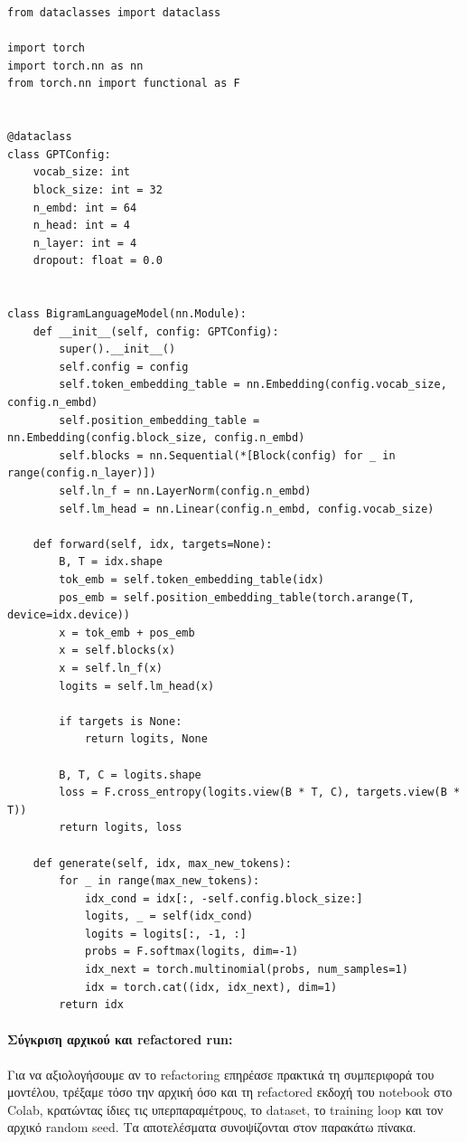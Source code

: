 \documentclass[11pt,a4paper]{article}
\begin{document}
\begin{lstlisting}[caption={Refactored configuration and model skeleton}]
from dataclasses import dataclass

import torch
import torch.nn as nn
from torch.nn import functional as F


@dataclass
class GPTConfig:
    vocab_size: int
    block_size: int = 32
    n_embd: int = 64
    n_head: int = 4
    n_layer: int = 4
    dropout: float = 0.0


class BigramLanguageModel(nn.Module):
    def __init__(self, config: GPTConfig):
        super().__init__()
        self.config = config
        self.token_embedding_table = nn.Embedding(config.vocab_size, config.n_embd)
        self.position_embedding_table = nn.Embedding(config.block_size, config.n_embd)
        self.blocks = nn.Sequential(*[Block(config) for _ in range(config.n_layer)])
        self.ln_f = nn.LayerNorm(config.n_embd)
        self.lm_head = nn.Linear(config.n_embd, config.vocab_size)

    def forward(self, idx, targets=None):
        B, T = idx.shape
        tok_emb = self.token_embedding_table(idx)
        pos_emb = self.position_embedding_table(torch.arange(T, device=idx.device))
        x = tok_emb + pos_emb
        x = self.blocks(x)
        x = self.ln_f(x)
        logits = self.lm_head(x)

        if targets is None:
            return logits, None

        B, T, C = logits.shape
        loss = F.cross_entropy(logits.view(B * T, C), targets.view(B * T))
        return logits, loss

    def generate(self, idx, max_new_tokens):
        for _ in range(max_new_tokens):
            idx_cond = idx[:, -self.config.block_size:]
            logits, _ = self(idx_cond)
            logits = logits[:, -1, :]
            probs = F.softmax(logits, dim=-1)
            idx_next = torch.multinomial(probs, num_samples=1)
            idx = torch.cat((idx, idx_next), dim=1)
        return idx
\end{lstlisting}

\paragraph{Σύγκριση αρχικού και \textlatin{refactored run}:}

Για να αξιολογήσουμε αν το \textlatin{refactoring} επηρέασε πρακτικά τη συμπεριφορά του μοντέλου,
τρέξαμε τόσο την αρχική όσο και τη \textlatin{refactored} εκδοχή του notebook στο \textlatin{Colab},
κρατώντας ίδιες τις υπερπαραμέτρους, το \textlatin{dataset}, το \textlatin{training loop} και τον αρχικό
\textlatin{random seed}. Τα αποτελέσματα συνοψίζονται στον παρακάτω πίνακα.
\end{document}
